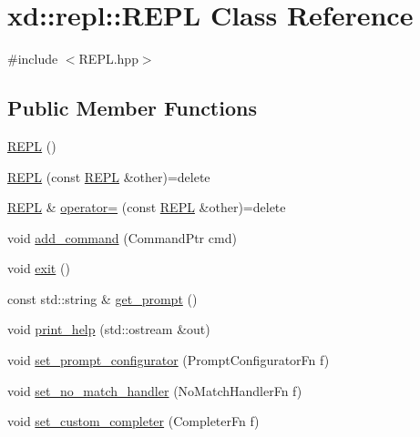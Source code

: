 \hypertarget{classxd_1_1repl_1_1_r_e_p_l}{}\section{xd\+:\+:repl\+:\+:R\+E\+PL Class Reference}
\label{classxd_1_1repl_1_1_r_e_p_l}


{\ttfamily \#include $<$R\+E\+P\+L.\+hpp$>$}

\subsection*{Public Member Functions}
\begin{DoxyCompactItemize}
\item 
\mbox{\hyperlink{classxd_1_1repl_1_1_r_e_p_l_a2e1d89ef893914e2384d0aa1baff3fdc}{R\+E\+PL}} ()
\item 
\mbox{\hyperlink{classxd_1_1repl_1_1_r_e_p_l_a8aea04977aafea7c131eb71650700f61}{R\+E\+PL}} (const \mbox{\hyperlink{classxd_1_1repl_1_1_r_e_p_l}{R\+E\+PL}} \&other)=delete
\item 
\mbox{\hyperlink{classxd_1_1repl_1_1_r_e_p_l}{R\+E\+PL}} \& \mbox{\hyperlink{classxd_1_1repl_1_1_r_e_p_l_ac25dfbc0192fd0b237c8d46f77dc7060}{operator=}} (const \mbox{\hyperlink{classxd_1_1repl_1_1_r_e_p_l}{R\+E\+PL}} \&other)=delete
\item 
void \mbox{\hyperlink{classxd_1_1repl_1_1_r_e_p_l_abc49ec956c98226be7b69198dc1fc989}{add\+\_\+command}} (Command\+Ptr cmd)
\item 
void \mbox{\hyperlink{classxd_1_1repl_1_1_r_e_p_l_a72853b794df8d5d1a405cebecda7f56f}{exit}} ()
\item 
const std\+::string \& \mbox{\hyperlink{classxd_1_1repl_1_1_r_e_p_l_aba522d734824a320868d5098adf6b21f}{get\+\_\+prompt}} ()
\item 
void \mbox{\hyperlink{classxd_1_1repl_1_1_r_e_p_l_a8e7da66c84643eae2f35d1dd829336d2}{print\+\_\+help}} (std\+::ostream \&out)
\item 
void \mbox{\hyperlink{classxd_1_1repl_1_1_r_e_p_l_aac13fa814e68437ba34ca9a654f272d3}{set\+\_\+prompt\+\_\+configurator}} (Prompt\+Configurator\+Fn f)
\item 
void \mbox{\hyperlink{classxd_1_1repl_1_1_r_e_p_l_a891f0a64d8a4daa94c4e3eb7e6d43e54}{set\+\_\+no\+\_\+match\+\_\+handler}} (No\+Match\+Handler\+Fn f)
\item 
void \mbox{\hyperlink{classxd_1_1repl_1_1_r_e_p_l_ac086dabd61f88f3f524aa429fec619c1}{set\+\_\+custom\+\_\+completer}} (Completer\+Fn f)
\end{DoxyCompactItemize}
